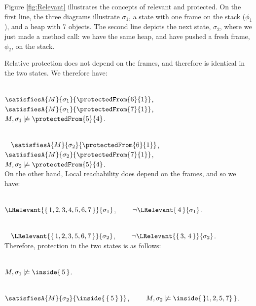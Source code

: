  
Figure \ref{fig:Relevant} illustrates the concepts of relevant and protected. On the first line, the   three diagrams illustrate $\sigma_1$, a state with one frame on the stack ($\phi_1$), and   a heap with 7 objects. 
The second line depicts the next  state, $\sigma_2$, where we just made a method call: we have the same heap, and have pushed a fresh frame, $\phi_2$,  on the stack.

Relative protection does not depend on the frames, and therefore is identical in the two states. We therefore have:\\
~ \strut \hspace{.2cm}  
$\satisfiesA{M}{\sigma_1}{\protectedFrom{6} {1}}$, \ \  \ \ 
$\satisfiesA{M}{\sigma_1}{\protectedFrom{7} {1}}$, \ \  \ \ 
$M, \sigma_1 \not\models {\protectedFrom{5} {4}}$.\\
~ \strut  ~ \hspace{.2cm}  
$\satisfiesA{M}{\sigma_2}{\protectedFrom{6} {1}}$, \ \ \ \ 
$\satisfiesA{M}{\sigma_2}{\protectedFrom{7} {1}}$, \ \  \ \ 
$M, \sigma_2 \not\models {\protectedFrom{5} {4}}$.\\
On the other hand, Local reachability does depend on the frames, and so we have:
\\
~ \strut \hspace{.2cm}  
$ \LRelevant{ \{\,1, 2, 3, 4, 5, 6, 7\, \}}{\sigma_1}$, \ \  \ \ $\neg {\LRelevant { \, 4\, }  {\sigma_1}}$.\\
~ \strut  ~ \hspace{.2cm}  
$\LRelevant{ \{\, 1, 2, 3, 5, 6, 7\,  \} }{\sigma_2}$, \ \  \ \ $\neg {\LRelevant{ \{\, 3,\, 4\,  \} } {\sigma_2}}$. \\
Therefore, protection in the two states is as follows:\\
~ \strut \hspace{.2cm}  
 $M, \sigma_1 \not\models {\inside{ \, 5 \, }}$.\\
~ \strut \hspace{.2cm}
$\satisfiesA{M}{\sigma_2}{\inside{\, \{\, 5\, \}  \, }}$, \ \  \ \   $M, \sigma_2 \not\models {\inside{ \, \}1, 2, 5, 7\} \, }}$.


 


 

